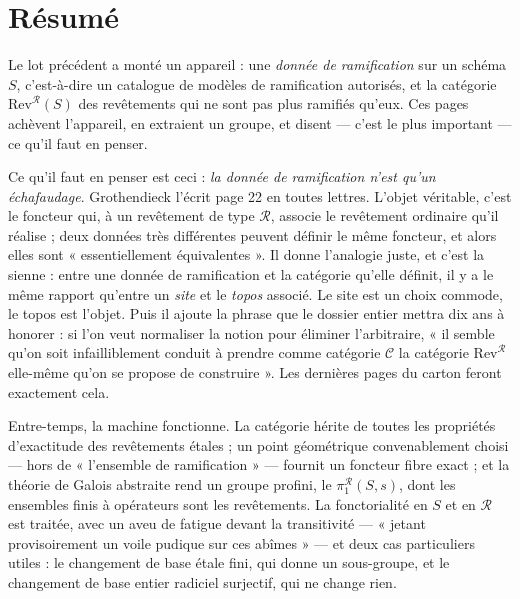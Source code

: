\documentclass[11pt,a4paper]{article}
\begin{document}
\section*{Résumé}

\begin{resume}
Le lot précédent a monté un appareil : une \emph{donnée de ramification} sur un
schéma $S$, c'est-à-dire un catalogue de modèles de ramification autorisés, et
la catégorie $\mathrm{Rev}^{\mathcal{R}}(S)$ des revêtements qui ne sont pas
plus ramifiés qu'eux. Ces pages achèvent l'appareil, en extraient un groupe, et
disent --- c'est le plus important --- ce qu'il faut en penser.

Ce qu'il faut en penser est ceci : \emph{la donnée de ramification n'est qu'un
échafaudage}. Grothendieck l'écrit page 22 en toutes lettres. L'objet
véritable, c'est le foncteur qui, à un revêtement de type $\mathcal{R}$,
associe le revêtement ordinaire qu'il réalise ; deux données très différentes
peuvent définir le même foncteur, et alors elles sont « essentiellement
équivalentes ». Il donne l'analogie juste, et c'est la sienne : entre une
donnée de ramification et la catégorie qu'elle définit, il y a le même rapport
qu'entre un \emph{site} et le \emph{topos} associé. Le site est un choix
commode, le topos est l'objet. Puis il ajoute la phrase que le dossier entier
mettra dix ans à honorer : si l'on veut normaliser la notion pour éliminer
l'arbitraire, « il semble qu'on soit infailliblement conduit à prendre comme
catégorie $\mathcal{C}$ la catégorie $\mathrm{Rev}^{\mathcal{R}}$ elle-même
qu'on se propose de construire ». Les dernières pages du carton feront
exactement cela.

Entre-temps, la machine fonctionne. La catégorie hérite de toutes les
propriétés d'exactitude des revêtements étales ; un point géométrique
convenablement choisi --- hors de « l'ensemble de ramification » --- fournit un
foncteur fibre exact ; et la théorie de Galois abstraite rend un groupe
profini, le $\pi_{1}^{\mathcal{R}}(S,s)$, dont les ensembles finis à opérateurs
sont les revêtements. La fonctorialité en $S$ et en $\mathcal{R}$ est traitée,
avec un aveu de fatigue devant la transitivité --- « jetant provisoirement un
voile pudique sur ces abîmes » --- et deux cas particuliers utiles : le
changement de base étale fini, qui donne un sous-groupe, et le changement de
base entier radiciel surjectif, qui ne change rien.


\end{resume}
\end{document}
